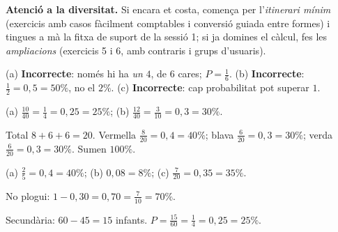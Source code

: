 \noindent\textbf{Atenció a la diversitat.} Si encara et costa, comença per l'\emph{itinerari
mínim} (exercicis amb casos fàcilment comptables i conversió guiada entre formes) i
tingues a mà la fitxa de suport de la sessió 1; si ja domines el càlcul, fes les
\emph{ampliacions} (exercicis 5 i 6, amb contraris i grups d'usuaris).

\begin{solucions}
\begin{sollist}
  \item (a) \textbf{Incorrecte}: només hi ha \emph{un} $4$, de $6$ cares;
        $P=\frac{1}{6}$. \quad (b) \textbf{Incorrecte}: $\frac{1}{2}=0,5=50\%$, no el
        $2\%$. \quad (c) \textbf{Incorrecte}: cap probabilitat pot superar $1$.
  \item (a) $\frac{10}{40}=\frac{1}{4}=0,25=25\%$; (b)
        $\frac{12}{40}=\frac{3}{10}=0,3=30\%$.
  \item Total $8+6+6=20$. Vermella $\frac{8}{20}=0,4=40\%$; blava
        $\frac{6}{20}=0,3=30\%$; verda $\frac{6}{20}=0,3=30\%$. Sumen $100\%$.
  \item (a) $\frac{2}{5}=0,4=40\%$; (b) $0,08=8\%$; (c) $\frac{7}{20}=0,35=35\%$.
  \item No plogui: $1-0,30=0,70=\frac{7}{10}=70\%$.
  \item Secundària: $60-45=15$ infants. $P=\frac{15}{60}=\frac{1}{4}=0,25=25\%$.
\end{sollist}
\end{solucions}
